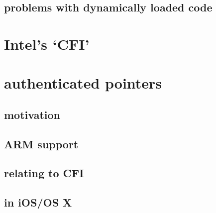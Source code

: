 \subsection{problems with dynamically loaded code}


\section{Intel's `CFI'}


\section{authenticated pointers}
\subsection{motivation}

\subsection{ARM support}

\subsection{relating to CFI}

\subsection{in iOS/OS X}

